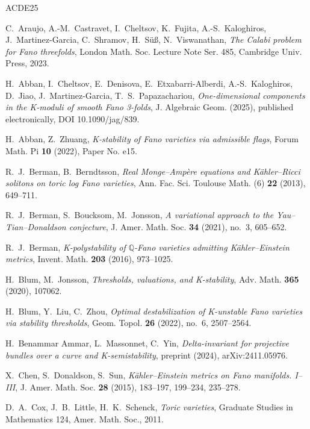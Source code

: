 \documentclass[11pt]{amsart}
\theoremstyle{definition}
\theoremstyle{remark}
\newcommand{\QQ}{\mathbb{Q}}
\begin{document}
\begin{thebibliography}{ACDE25}

C.~Araujo, A.-M.~Castravet, I.~Cheltsov, K.~Fujita, A.-S.~Kaloghiros,
J.~Martinez-Garcia, C.~Shramov, H.~S\"u\ss{}, N.~Viswanathan,
\emph{The Calabi problem for Fano threefolds},
London Math. Soc. Lecture Note Ser. 485, Cambridge Univ. Press, 2023.

H.~Abban, I.~Cheltsov, E.~Denisova, E.~Etxabarri-Alberdi,
A.-S.~Kaloghiros, D.~Jiao, J.~Martinez-Garcia, T.~S.~Papazachariou,
\emph{One-dimensional components in the K-moduli of smooth Fano
3-folds}, J. Algebraic Geom. (2025), published electronically,
DOI 10.1090/jag/839.

H.~Abban, Z.~Zhuang,
\emph{K-stability of Fano varieties via admissible flags},
Forum Math. Pi \textbf{10} (2022), Paper No. e15.

R.~J.~Berman, B.~Berndtsson,
\emph{Real Monge--Amp\`ere equations and K\"ahler--Ricci solitons on
toric log Fano varieties},
Ann. Fac. Sci. Toulouse Math. (6) \textbf{22} (2013), 649--711.

R.~J.~Berman, S.~Boucksom, M.~Jonsson,
\emph{A variational approach to the Yau--Tian--Donaldson conjecture},
J. Amer. Math. Soc. \textbf{34} (2021), no.~3, 605--652.

R.~J.~Berman,
\emph{K-polystability of $\QQ$-Fano varieties admitting
K\"ahler--Einstein metrics},
Invent. Math. \textbf{203} (2016), 973--1025.

H.~Blum, M.~Jonsson,
\emph{Thresholds, valuations, and K-stability},
Adv. Math. \textbf{365} (2020), 107062.

H.~Blum, Y.~Liu, C.~Zhou,
\emph{Optimal destabilization of K-unstable Fano varieties via
stability thresholds},
Geom. Topol. \textbf{26} (2022), no.~6, 2507--2564.

H.~Benammar Ammar, L.~Massonnet, C.~Yin,
\emph{Delta-invariant for projective bundles over a curve and
K-semistability}, preprint (2024), arXiv:2411.05976.

X.~Chen, S.~Donaldson, S.~Sun,
\emph{K\"ahler--Einstein metrics on Fano manifolds. I--III},
J. Amer. Math. Soc. \textbf{28} (2015), 183--197, 199--234, 235--278.

D.~A.~Cox, J.~B.~Little, H.~K.~Schenck,
\emph{Toric varieties},
Graduate Studies in Mathematics 124, Amer. Math. Soc., 2011.


\end{thebibliography}
\end{document}

